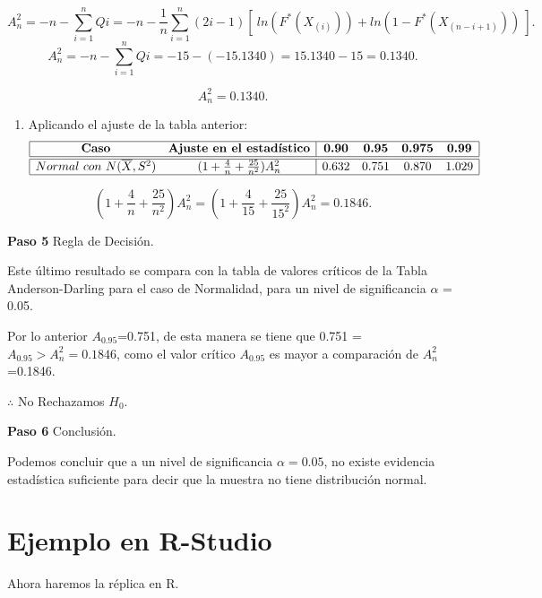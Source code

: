 \documentclass[
  a4paper,
  oneside,
  openany]{book}
\providecommand{\tightlist}{%
  \setlength{\itemsep}{0pt}\setlength{\parskip}{0pt}}
\begin{document}
\[A_n^2=-n-\sum_{i=1}^{n}Qi=-n-\frac{1}{n}\sum_{i=1}^{n}\left(2i-1\right)[ \ ln(F^*(X_{(i)})) +ln(1-F^*(X_{(n-i+1)})) \ ].\]
\[A_n^2=-n-\sum_{i=1}^{n}Qi=-15-(-15.1340)=15.1340-15=0.1340.\]

\[A_n^2=0.1340.\]

\begin{enumerate}
\def\labelenumi{\arabic{enumi})}
\setcounter{enumi}{7}
\tightlist
\item
  Aplicando el ajuste de la tabla anterior:
  \[
  \begin{array}{|c c| c c c c|}
  \hline
  \textbf{Caso} & \textbf{Ajuste en el estadístico} &\textbf{0.90} &\textbf{0.95} & \textbf{0.975} & \textbf{0.99} \\
  \hline
  \hline
  Normal\ con\ N(\overline{X},S^2) & (1+\frac{4}{n}+\frac{25}{n^2})A_{n}^{2} & 0.632 & 0.751 & 0.870 & 1.029 \\
  \hline
  \end{array}
  \]
\end{enumerate}

\[ (1+\frac{4}{n}+\frac{25}{n^2})A_{n}^{2}=(1+\frac{4}{15}+\frac{25}{15^2})A_{n}^{2}=0.1846.\]

\textbf{Paso 5} Regla de Decisión.

Este último resultado se compara con la tabla de valores críticos de la Tabla Anderson-Darling para el caso de Normalidad, para un nivel de significancia \(\alpha\) = 0.05.

Por lo anterior \(A_{0.95}\)=0.751, de esta manera se tiene que 0.751 = \(A_{0.95} > A_{n}^2=0.1846\), como el valor crítico \(A_{0.95}\) es mayor a comparación de \(A_{n}^2\)=0.1846.

\(\therefore\) No Rechazamos \(H_0\).

\textbf{Paso 6} Conclusión.

Podemos concluir que a un nivel de significancia \(\alpha=0.05\), no existe evidencia estadística suficiente para decir que la muestra no tiene distribución normal.

\hypertarget{ejemplo-en-r-studio-17}{%
\section{Ejemplo en R-Studio}\label{ejemplo-en-r-studio-17}}

Ahora haremos la réplica en R.
\end{document}
